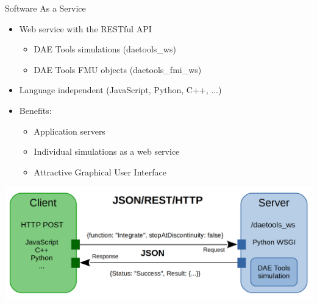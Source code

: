 \documentclass[compress,newPxFont,sthlmFooter]{beamer}
\begin{document}
\begin{frame}{Software As a Service}
    \begin{itemize}
      \item \alert{Web service with the RESTful API} 
        \begin{itemize}
          \item DAE Tools simulations (daetools\_ws)
          \item DAE Tools FMU objects (daetools\_fmi\_ws)
        \end{itemize}
      \item \alert{Language independent} (JavaScript, Python, C++, ...)
      \item \alert{Benefits}:
        \begin{itemize}
          \item Application servers
          \item Individual simulations as a web service
          \item Attractive Graphical User Interface
        \end{itemize}
    \end{itemize}
    \begin{center}
        \includegraphics[align=c, height=0.30\paperheight]{daetools_web_service.png}
    \end{center}
\end{frame}
\end{document}
